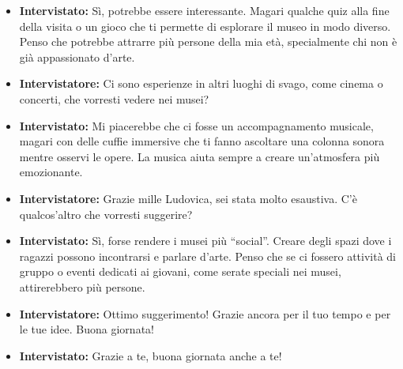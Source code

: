 \documentclass{article}
\begin{document}
\begin{itemize}
    \item \textbf{Intervistato:} Sì, potrebbe essere interessante. Magari qualche quiz alla fine della visita o un gioco che ti permette di esplorare il museo in modo diverso. Penso che potrebbe attrarre più persone della mia età, specialmente chi non è già appassionato d’arte.

    \item \textbf{Intervistatore:} Ci sono esperienze in altri luoghi di svago, come cinema o concerti, che vorresti vedere nei musei?

    \item \textbf{Intervistato:} Mi piacerebbe che ci fosse un accompagnamento musicale, magari con delle cuffie immersive che ti fanno ascoltare una colonna sonora mentre osservi le opere. La musica aiuta sempre a creare un’atmosfera più emozionante.

    \item \textbf{Intervistatore:} Grazie mille Ludovica, sei stata molto esaustiva. C’è qualcos'altro che vorresti suggerire?

    \item \textbf{Intervistato:} Sì, forse rendere i musei più “social”. Creare degli spazi dove i ragazzi possono incontrarsi e parlare d’arte. Penso che se ci fossero attività di gruppo o eventi dedicati ai giovani, come serate speciali nei musei, attirerebbero più persone.

    \item \textbf{Intervistatore:} Ottimo suggerimento! Grazie ancora per il tuo tempo e per le tue idee. Buona giornata!

    \item \textbf{Intervistato:} Grazie a te, buona giornata anche a te!
    
\end{itemize}
\end{document}
